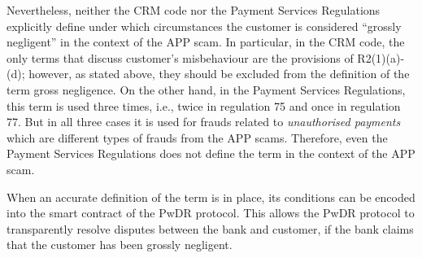  Nevertheless, neither the CRM code  nor the Payment Services Regulations   explicitly define under which circumstances the customer is considered ``grossly negligent'' in the context of the APP scam. In particular, in the CRM code, the only terms that discuss customer's misbehaviour are  the provisions of R2(1)(a)-(d); however, as stated above, they should be excluded from the definition of the term gross negligence. On the  other hand,  in the Payment Services Regulations, this term is used three times, i.e.,  twice in regulation 75 and once in regulation 77. But in all  three cases it is used for frauds related to \emph{unauthorised payments} which are  different types of frauds from the APP scams. Therefore, even the Payment Services Regulations does not define the term in the context of the APP scam. 
 
 When an  accurate definition of the term is in place,  its conditions can be encoded into the smart contract of the PwDR protocol. This allows the PwDR protocol to transparently resolve  disputes  between the bank and customer, if the bank claims that the customer has been  grossly negligent. 